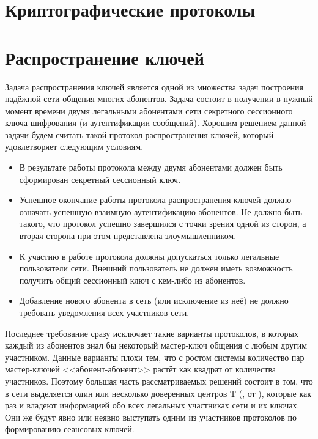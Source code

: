 \chapter{Криптографические протоколы}\label{chapter-protocols}













\chapter{Распространение ключей}\label{chapter-key-distribution-protocols}

Задача распространения ключей является одной из множества задач построения надёжной сети общения многих абонентов. Задача состоит в получении в нужный момент времени двумя легальными абонентами сети секретного сессионного ключа шифрования (и аутентификации сообщений). Хорошим решением данной задачи будем считать такой протокол распространения ключей, который удовлетворяет следующим условиям.

\begin{itemize}
	\item В результате работы протокола между двумя абонентами должен быть сформирован секретный сессионный ключ.
	\item Успешное окончание работы протокола распространения ключей должно означать успешную взаимную аутентификацию абонентов. Не должно быть такого, что протокол успешно завершился с точки зрения одной из сторон, а вторая сторона при этом представлена злоумышленником.
	\item К участию в работе протокола должны допускаться только легальные пользователи сети. Внешний пользователь не должен иметь возможность получить общий сессионный ключ с кем-либо из абонентов.
	\item Добавление нового абонента в сеть (или исключение из неё) не должно требовать уведомления всех участников сети.
\end{itemize}

Последнее требование сразу исключает такие варианты протоколов, в которых каждый из абонентов знал бы некоторый мастер-ключ общения с любым другим участником. Данные варианты плохи тем, что с ростом системы количество пар мастер-ключей <<абонент-абонент>> растёт как квадрат от количества участников. Поэтому большая часть рассматриваемых решений состоит в том, что в сети выделяется один или несколько доверенных центров T (, от ), которые как раз и владеют информацией обо всех легальных участниках сети и их ключах. Они же будут явно или неявно выступать одним из участников протоколов по формированию сеансовых ключей.

